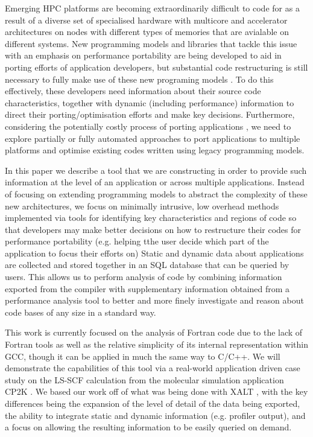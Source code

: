 Emerging HPC platforms are becoming extraordinarily difficult to code for as a result of a diverse set of specialised hardware with multicore and accelerator architectures on nodes with different types of memories that are avialable on different systems.
New programming models and libraries that tackle this issue with an emphasis on performance portability are being developed to aid in porting efforts of application developers, but substantial code restructuring is still necessary to fully make use of these new programing models \cite{anantharaj2013}\cite{titan}.
To do this effectively, these developers need information about their source code characteristics, together with dynamic (including performance) information to direct their porting/optimisation efforts and make key decisions.
Furthermore, considering the potentially costly process of porting applications \cite{larrea2016early}, we need to explore partially or fully automated approaches to port applications to multiple platforms and optimise existing codes written using legacy programming models.

In this paper we describe a tool that we are constructing in order to provide such information at the level of an application or across multiple applications.
Instead of focusing on extending programming models to abstract the complexity of these new architectures, we focus on minimally intrusive, low overhead methods implemented via tools for identifying key characteristics and regions of code so that developers may make better decisions on how to restructure their codes for performance portability (e.g. 
helping tthe user decide which part of the application to focus their efforts on)
Static and dynamic data about applications are collected and stored together in an \acs{SQL} database that can be queried by users.
This allows us to perform analysis of code by combining information exported from the compiler with supplementary information obtained from a performance analysis tool to better and more finely investigate and reason about code bases of any size in a standard way.

This work is currently focused on the analysis of Fortran code due to the lack of Fortran tools as well as the relative simplicity of its internal representation within \acs{GCC}, though it can be applied in much the same way to C/C++.
We will demonstrate the capabilities of this tool via a real-world application driven case study on the \ac{LS-SCF} calculation \cite{vandevondele2012linear} from the molecular simulation application CP2K \cite{hutter2014cp2k}.
We based our work off of what was being done with XALT \cite{7081224}, with the key differences being the expansion of the level of detail of the data being exported, the ability to integrate static and dynamic information (e.g. profiler output), and a focus on allowing the resulting information to be easily queried on demand.

